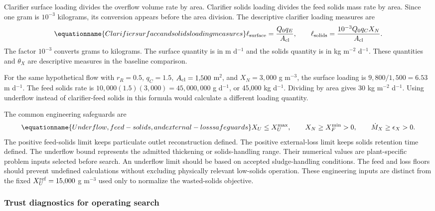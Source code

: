 Clarifier surface loading divides the overflow volume rate by area. Clarifier solids loading divides the feed solids mass rate by area. Since one gram is $10^{-3}$ kilograms, its conversion appears before the area division. The descriptive clarifier loading measures are
\begin{equation}
\equationname{Clarifier surface and solids loading measures}
\ell_{\rm surface}=\frac{Q_0q_E}{A_{\rm cl}},\qquad
\ell_{\rm solids}=\frac{10^{-3}Q_0q_CX_N}{A_{\rm cl}}.
\label{eq:plant_loading_measures}
\end{equation}
The factor $10^{-3}$ converts grams to kilograms. The surface quantity is in m d$^{-1}$ and the solids quantity is in kg m$^{-2}$ d$^{-1}$. These quantities and $\theta_X$ are descriptive measures in the baseline comparison.

For the same hypothetical flow with $r_R=0.5$, $q_C=1.5$, $A_{\rm cl}=1{,}500$ m$^2$, and $X_N=3{,}000$ g m$^{-3}$, the surface loading is $9{,}800/1{,}500=6.53$ m d$^{-1}$. The feed solids rate is $10{,}000(1.5)(3{,}000)=45{,}000{,}000$ g d$^{-1}$, or 45{,}000 kg d$^{-1}$. Dividing by area gives 30 kg m$^{-2}$ d$^{-1}$. Using underflow instead of clarifier-feed solids in this formula would calculate a different loading quantity.

The common engineering safeguards are
\begin{equation}
\equationname{Underflow, feed-solids, and external-loss safeguards}
X_U\le X_U^{\max},\qquad X_N\ge X_F^{\min}>0,\qquad
\dot M_X\ge\epsilon_X>0.
\label{eq:plant_engineering_safeguards}
\end{equation}
The positive feed-solids limit keeps particulate outlet reconstruction defined. The positive external-loss limit keeps solids retention time defined. The underflow bound represents the admitted thickening or solids-handling range. Their numerical values are plant-specific problem inputs selected before search. An underflow limit should be based on accepted sludge-handling conditions. The feed and loss floors should prevent undefined calculations without excluding physically relevant low-solids operation. These engineering inputs are distinct from the fixed $X_U^{\rm ref}=15{,}000$ g m$^{-3}$ used only to normalize the wasted-solids objective.

\subsubsection{Trust diagnostics for operating search}

